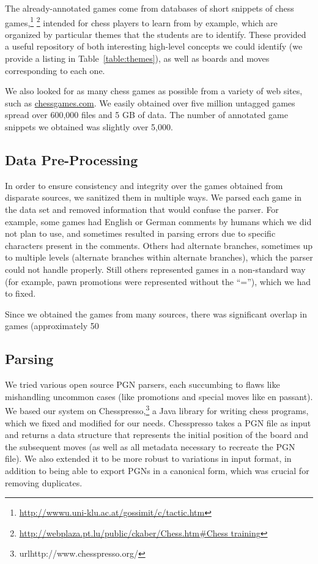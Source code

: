 \documentclass[11pt]{article}
\begin{document}
The already-annotated games come from databases of short snippets of chess games,\footnote{\url{http://wwwu.uni-klu.ac.at/gossimit/c/tactic.htm}} \footnote{\url{http://webplaza.pt.lu/public/ckaber/Chess.htm#Chess training}} intended for chess players to learn from by example, which are organized by particular themes that the students are to identify. These provided a useful repository of both interesting high-level concepts we could identify (we provide a listing in Table~\ref{table:themes}), as well as boards and moves corresponding to each one.

We also looked for as many chess games as possible from a variety of web sites, such as \url{chessgames.com}. We easily obtained over five million untagged games spread over 600,000 files and 5 GB of data. The number of annotated game snippets we obtained was slightly over 5,000.

\subsection{Data Pre-Processing}	
In order to ensure consistency and integrity over the games obtained from disparate sources, we sanitized them in multiple ways. We parsed each game in the data set and removed information that would confuse the parser. For example, some games had English or German comments by humans which we did not plan to use, and sometimes resulted in parsing errors due to specific characters present in the comments. Others had alternate branches, sometimes up to multiple levels (alternate branches within alternate branches), which the parser could not handle properly. Still others represented games in a non-standard way (for example, pawn promotions were represented without the ``=''), which we had to fixed. 

Since we obtained the games from many sources, there was significant overlap in games (approximately 50%

\subsection{Parsing}
We tried various open source PGN parsers, each succumbing to flaws like mishandling uncommon cases (like promotions and special moves like en passant). We based our system on Chesspresso,\footnote{url{http://www.chesspresso.org/}} a Java library for writing chess programs, which we fixed and modified for our needs. Chesspresso takes a PGN file as input and returns a data structure that represents the initial position of the board and the subsequent moves (as well as all metadata necessary to recreate the PGN file). We also extended it to be more robust to variations in input format, in addition to being able to export PGNs in a canonical form, which was crucial for removing duplicates.
\end{document}
